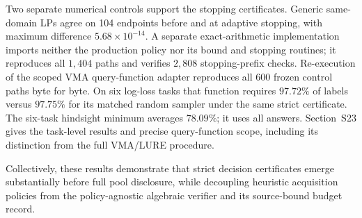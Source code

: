 Two separate numerical controls support the stopping certificates. Generic same-domain LPs agree on 104 endpoints before and at adaptive stopping, with maximum difference $5.68\times10^{-14}$. A separate exact-arithmetic implementation imports neither the production policy nor its bound and stopping routines; it reproduces all $1{,}404$ paths and verifies $2{,}808$ stopping-prefix checks. Re-execution of the scoped VMA query-function adapter reproduces all $600$ frozen control paths byte for byte. On six log-loss tasks that function requires $97.72\%$ of labels versus $97.75\%$ for its matched random sampler under the same strict certificate. The six-task hindsight minimum averages $78.09\%$; it uses all answers. Section~S23 gives the task-level results and precise query-function scope, including its distinction from the full VMA/LURE procedure.

Collectively, these results demonstrate that strict decision certificates emerge substantially before full pool disclosure, while decoupling heuristic acquisition policies from the policy-agnostic algebraic verifier and its source-bound budget record.